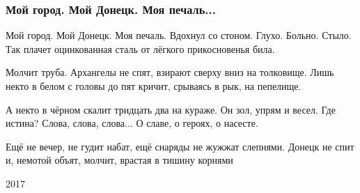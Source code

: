  
 
 

\subsubsection{Мой город. Мой Донецк. Моя печаль...}

Мой город. Мой Донецк. Моя печаль.
Вдохнул со стоном. Глухо. Больно. Стыло.
Так плачет оцинкованная сталь
от лёгкого прикосновенья била.

Молчит труба. Архангелы не спят,
взирают сверху вниз на толковище.
Лишь некто в белом с головы до пят
кричит, срываясь в рык, на пепелище.

А некто в чёрном скалит тридцать два
на кураже. Он зол, упрям и весел.
Где истина? Слова, слова, слова...
О славе, о героях, о насесте.

Ещё не вечер, не гудит набат,
ещё снаряды не жужжат слепнями.
Донецк не спит и, немотой объят,
молчит, врастая в тишину корнями

2017 
